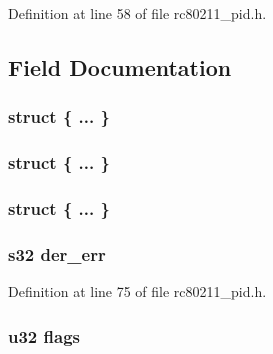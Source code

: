 Definition at line 58 of file rc80211\-\_\-pid.\-h.



\subsection{Field Documentation}
\hypertarget{unionrc__pid__event__data_aed2b6243e8e4af2dae005339387e6067}{\subsubsection[{"@17}]{\setlength{\rightskip}{0pt plus 5cm}struct \{ ... \} }}\label{unionrc__pid__event__data_aed2b6243e8e4af2dae005339387e6067}
\hypertarget{unionrc__pid__event__data_aee5035e2df8993315ce9e2892094eafa}{\subsubsection[{"@19}]{\setlength{\rightskip}{0pt plus 5cm}struct \{ ... \} }}\label{unionrc__pid__event__data_aee5035e2df8993315ce9e2892094eafa}
\hypertarget{unionrc__pid__event__data_a466b53d954cb3e17b5c6e2a30db7f735}{\subsubsection[{"@21}]{\setlength{\rightskip}{0pt plus 5cm}struct \{ ... \} }}\label{unionrc__pid__event__data_a466b53d954cb3e17b5c6e2a30db7f735}
\hypertarget{unionrc__pid__event__data_a6e974dd77139e01c6060f753dc03b0f7}{
\subsubsection[{der\-\_\-err}]{\setlength{\rightskip}{0pt plus 5cm}s32 der\-\_\-err}}\label{unionrc__pid__event__data_a6e974dd77139e01c6060f753dc03b0f7}


Definition at line 75 of file rc80211\-\_\-pid.\-h.

\hypertarget{unionrc__pid__event__data_a9fb2abd9f2594cefc48d6856e01f2879}{
\subsubsection[{flags}]{\setlength{\rightskip}{0pt plus 5cm}u32 flags}}\label{unionrc__pid__event__data_a9fb2abd9f2594cefc48d6856e01f2879}


